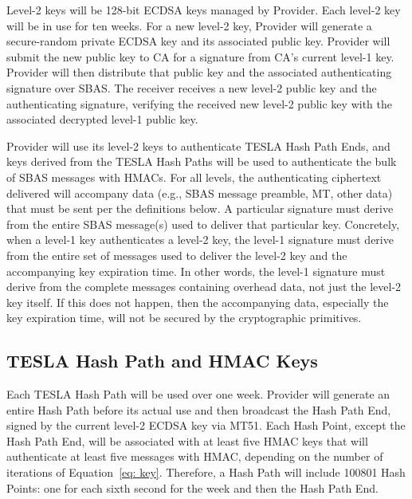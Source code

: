 \documentclass[letterpaper,times]{IONconf/IONconf}
\begin{document}
		Level-2 keys will be 128-bit ECDSA keys managed by Provider.
		Each level-2 key will be in use for ten weeks.
		For a new level-2 key, Provider will generate a secure-random private ECDSA key and its associated public key.
		Provider will submit the new public key to CA for a signature from CA's current level-1 key.
		Provider will then distribute that public key and the associated authenticating signature over SBAS.
		The receiver receives a new level-2 public key and the authenticating signature, verifying the received new level-2 public key with the associated decrypted level-1 public key.

		Provider will use its level-2 keys to authenticate TESLA Hash Path Ends, and keys derived from the TESLA Hash Paths will be used to authenticate the bulk of SBAS messages with HMACs.
		For all levels, the authenticating ciphertext delivered will accompany data (e.g., SBAS message preamble, MT, other data) that must be sent per the definitions below.
		A particular signature must derive from the entire SBAS message(s) used to deliver that particular key.
		Concretely, when a level-1 key authenticates a level-2 key, the level-1 signature must derive from the entire set of messages used to deliver the level-2 key and the accompanying key expiration time. 
		In other words, the level-1 signature must derive from the complete messages containing overhead data, not just the level-2 key itself.
		If this does not happen, then the accompanying data, especially the key expiration time, will not be secured by the cryptographic primitives.

	\subsection{TESLA Hash Path and HMAC Keys} \label{sub:tesla_hash_path}

		Each TESLA Hash Path will be used over one week.
		Provider will generate an entire Hash Path before its actual use and then broadcast the Hash Path End, signed by the current level-2 ECDSA key via MT51.
		Each Hash Point, except the Hash Path End, will be associated with at least five HMAC keys that will authenticate at least five messages with HMAC, depending on the number of iterations of Equation~\eqref{eq: key}.
		Therefore, a Hash Path will include 100801 Hash Points: one for each sixth second for the week and then the Hash Path End.
\end{document}
